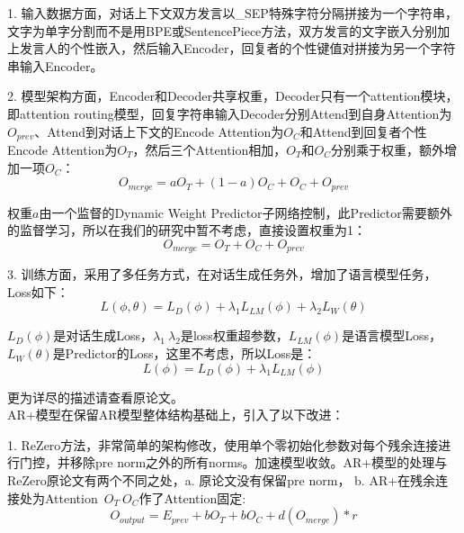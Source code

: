 \documentclass[letterpaper]{article} %
\DeclareRobustCommand{\citeext}[1]{\cite[#1]{#1}}
\begin{document}
\begin{CJK*}{UTF8}{gbsn}
1. 输入数据方面，对话上下文双方发言以\_SEP特殊字符分隔拼接为一个字符串，文字为单字分割而不是用BPE或SentencePiece方法，双方发言的文字嵌入分别加上发言人的个性嵌入，然后输入Encoder，回复者的个性键值对拼接为另一个字符串输入Encoder。

2. 模型架构方面，Encoder和Decoder共享权重，Decoder只有一个attention模块，即attention routing模型，回复字符串输入Decoder分别Attend到自身Attention为\\$O_{prev}$、Attend到对话上下文的Encode Attention为$O_C$和Attend到回复者个性Encode Attention为$O_T$，然后三个Attention相加，$O_T$和$O_C$分别乘于权重，额外增加一项$O_C$：
\begin{equation}
O_{merge} = aO_T + (1 - a)O_C + O_C + O_{prev}    
\end{equation}

权重$a$由一个监督的Dynamic Weight Predictor子网络控制，此Predictor需要额外的监督学习，所以在我们的研究中暂不考虑，直接设置权重为1：
\begin{equation}
O_{merge} = O_T + O_C + O_{prev}    
\end{equation}

3. 训练方面，采用了多任务方式，在对话生成任务外，增加了语言模型任务，Loss如下：
\begin{equation}
L(\phi, \theta) = L_D(\phi) + \lambda_1L_{LM}(\phi) + \lambda_2L_W(\theta)
\end{equation}

$L_D(\phi)$是对话生成Loss，$\lambda_1~\lambda_2$是loss权重超参数，$L_{LM}(\phi)$是语言模型Loss，\\$L_W(\theta)$是Predictor的Loss，这里不考虑，所以Loss是：
\begin{equation}
L(\phi) = L_D(\phi) + \lambda_1L_{LM}(\phi)
\end{equation}

更为详尽的描述请查看原论文\citeext{Zheng2019}。\\

AR+模型在保留AR模型整体结构基础上，引入了以下改进：

1. ReZero\citeext{Bachlechner2020}方法，非常简单的架构修改，使用单个零初始化参数对每个残余连接进行门控，并移除pre norm之外的所有norms。加速模型收敛。AR+模型的处理与ReZero原论文有两个不同之处，a. 原论文没有保留pre norm， b. AR+在残余连接处为Attention~$O_T~O_C$作了Attention固定:
\begin{equation}
O_{output} = E_{prev} + bO_T + bO_C + d(O_{merge}) * r
\end{equation}


\end{CJK*}
\end{document}
